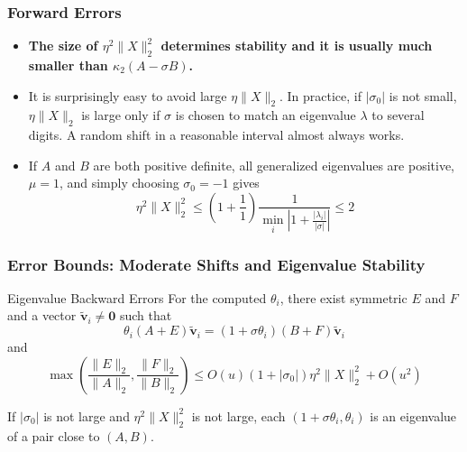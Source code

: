 \documentclass[landscape]{beamer}
\renewcommand{\vec}[1]{\bm{#1}}
\begin{document}
\begin{frame}
  \frametitle{Forward Errors}


  \begin{itemize}
  \item {\bf The size of $\eta^2 \|X\|_2^2$ determines stability and
      it is usually much smaller than $\kappa_2(A-\sigma B)$.}
  \item It is surprisingly easy to avoid large $\eta \|X\|_2$.  In
    practice, if $|\sigma_0|$ is not small, $\eta \|X\|_2$ is large
    only if $\sigma$ is chosen to match an eigenvalue $\lambda$ to
    several digits.  A random shift in a reasonable interval almost
    always works.
  \item If $A$ and $B$ are both positive definite, all generalized eigenvalues
    are positive, $\mu = 1$, and simply choosing $\sigma_0 = -1$ gives
    \begin{equation*}
      \eta^2 \|X\|_2^2 \leq 
      \left(1 + \frac{1}{1}\right) \frac{1}{\min_i \left| 1 + \frac{|\lambda_i|}{|\sigma|}\right|} \leq 2
    \end{equation*}

  \end{itemize}
\end{frame}


\begin{frame}
  \frametitle{Error Bounds: Moderate Shifts and Eigenvalue Stability}

  \begin{block}{Eigenvalue Backward Errors}
    For the computed $\theta_i$, there exist symmetric $E$ and $F$ and
    a vector $\tilde{\vec{v}}_i\neq \vec{0}$ such that
    \begin{equation*}
      \theta_i (A+E) \tilde{\vec{v}}_i = (1+\sigma \theta_i) (B+F) \tilde{\vec{v}}_i
    \end{equation*}
    and
    \begin{equation*}
      \max\left(\frac{\|E\|_2}{\|A\|_2}, \frac{\|F\|_2}{\|B\|_2}\right) \leq 
      O(u) (1+|\sigma_0|) \eta^2 \|X\|_2^2 + O(u^2)
    \end{equation*}
  \end{block}

  If $|\sigma_0|$ is not large and $\eta^2 \|X\|_2^2$ is not large, each
  $(1+\sigma \theta_i, \theta_i)$ is an eigenvalue of a pair close to $(A,B)$.
\end{frame}
\end{document}
